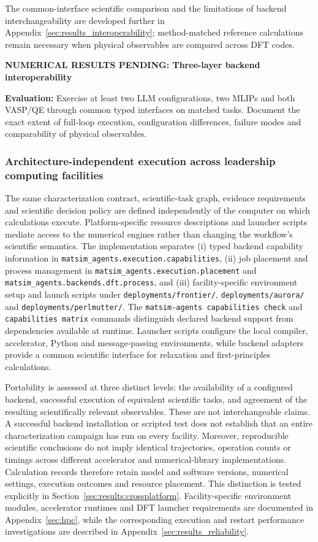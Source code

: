 \documentclass[11pt,a4paper]{article}
\newcommand{\newexperiment}[2]{\par\medskip\noindent\begingroup\color{red!80!black}\textbf{NUMERICAL RESULTS PENDING: #1}\par\noindent\textbf{Evaluation:} #2\par\endgroup\medskip}
\begin{document}
The common-interface scientific comparison and the limitations of backend interchangeability are developed further in Appendix~\ref{sec:results_interoperability}; method-matched reference calculations remain necessary when physical observables are compared across DFT codes.

\newexperiment{Three-layer backend interoperability}{Exercise at least two LLM configurations, two MLIPs and both VASP/QE through common typed interfaces on matched tasks. Document the exact extent of full-loop execution, configuration differences, failure modes and comparability of physical observables.}


\subsubsection{Architecture-independent execution across leadership computing facilities}
\label{sec:methods:portability}
The same characterization contract, scientific-task graph, evidence requirements and scientific decision policy are defined independently of the computer on which calculations execute. Platform-specific resource descriptions and launcher scripts mediate access to the numerical engines rather than changing the workflow's scientific semantics. The implementation separates (i) typed backend capability information in \texttt{matsim\_agents.execution.capabilities}, (ii) job placement and process management in \texttt{matsim\_agents.execution.placement} and \texttt{matsim\_agents.backends.dft.process}, and (iii) facility-specific environment setup and launch scripts under \texttt{deployments/frontier/}, \texttt{deployments/aurora/} and \texttt{deployments/perlmutter/}. The \texttt{matsim-agents capabilities check} and \texttt{capabilities matrix} commands distinguish declared backend support from dependencies available at runtime. Launcher scripts configure the local compiler, accelerator, Python and message-passing environments, while backend adapters provide a common scientific interface for relaxation and first-principles calculations.

Portability is assessed at three distinct levels: the availability of a configured backend, successful execution of equivalent scientific tasks, and agreement of the resulting scientifically relevant observables. These are not interchangeable claims. A successful backend installation or scripted test does not establish that an entire characterization campaign has run on every facility. Moreover, reproducible scientific conclusions do not imply identical trajectories, operation counts or timings across different accelerator and numerical-library implementations. Calculation records therefore retain model and software versions, numerical settings, execution outcomes and resource placement. This distinction is tested explicitly in Section~\ref{sec:results:crossplatform}. Facility-specific environment modules, accelerator runtimes and DFT launcher requirements are documented in Appendix~\ref{sec:hpc}, while the corresponding execution and restart performance investigations are described in Appendix~\ref{sec:results_reliability}.
\end{document}
